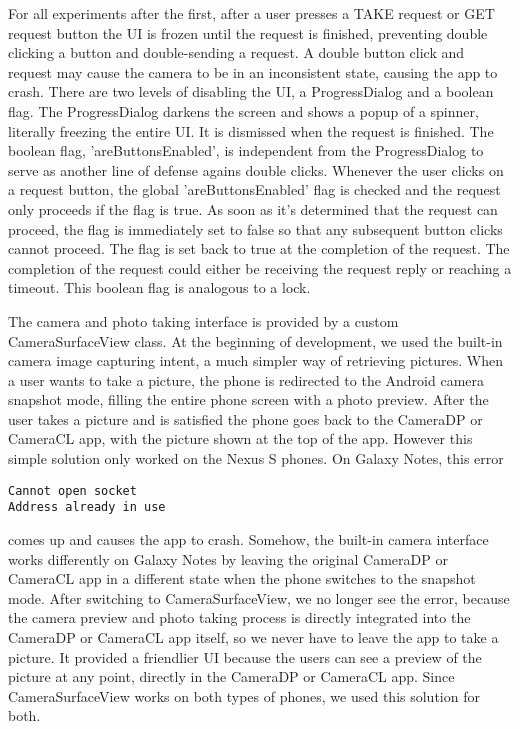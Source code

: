 For all experiments after the first, after a user presses a TAKE request or GET request button the UI is frozen until the request is finished, preventing double clicking a button and double-sending a request. A double button click and request may cause the camera to be in an inconsistent state, causing the app to crash. There are two levels of disabling the UI, a ProgressDialog and a boolean flag. The ProgressDialog darkens the screen and shows a popup of a spinner, literally freezing the entire UI. It is dismissed when the request is finished. The boolean flag, 'areButtonsEnabled', is independent from the ProgressDialog to serve as another line of defense agains double clicks. Whenever the user clicks on a request button, the global 'areButtonsEnabled' flag is checked and the request only proceeds if the flag is true. As soon as it's determined that the request can proceed, the flag is immediately set to false so that any subsequent button clicks cannot proceed. The flag is set back to true at the completion of the request. The completion of the request could either be receiving the request reply or reaching a timeout. This boolean flag is analogous to a lock.

The camera and photo taking interface is provided by a custom CameraSurfaceView class. At the beginning of development, we used the built-in camera image capturing intent, a much simpler way of retrieving pictures. When a user wants to take a picture, the phone is redirected to the Android camera snapshot mode, filling the entire phone screen with a photo preview. After the user takes a picture and is satisfied the phone goes back to the CameraDP or CameraCL app, with the picture shown at the top of the app. However this simple solution only worked on the Nexus S phones. On Galaxy Notes, this error
\begin{verbatim}
Cannot open socket
Address already in use
\end{verbatim}
comes up and causes the app to crash. Somehow, the built-in camera interface works differently on Galaxy Notes by leaving the original CameraDP or CameraCL app in a different state when the phone switches to the snapshot mode. After switching to CameraSurfaceView, we no longer see the error, because the camera preview and photo taking process is directly integrated into the CameraDP or CameraCL app itself, so we never have to leave the app to take a picture. It provided a friendlier UI because the users can see a preview of the picture at any point, directly in the CameraDP or CameraCL app. Since CameraSurfaceView works on both types of phones, we used this solution for both.

